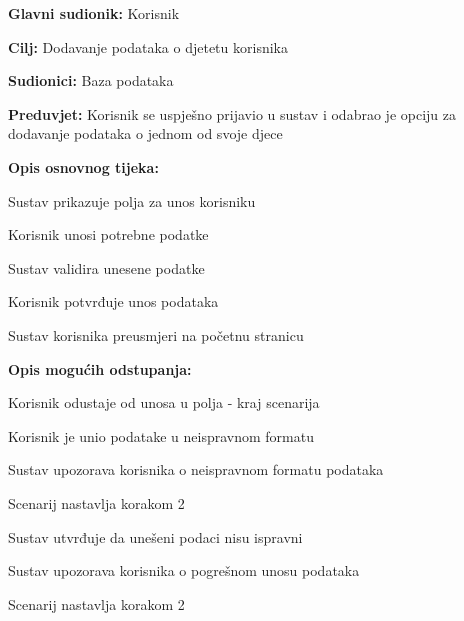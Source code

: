 					\noindent {}
					\begin{packed_item}
	
						\item \textbf{Glavni sudionik: }Korisnik
						\item  \textbf{Cilj:} Dodavanje podataka o djetetu korisnika
						\item  \textbf{Sudionici:} Baza podataka
						\item  \textbf{Preduvjet:} Korisnik se uspješno prijavio u sustav i odabrao je opciju za dodavanje podataka o jednom od svoje djece
						\item  \textbf{Opis osnovnog tijeka:}
						
						\item[] \begin{packed_enum}
							\item Sustav prikazuje polja za unos korisniku
							\item Korisnik unosi potrebne podatke
							\item Sustav validira unesene podatke
							\item Korisnik potvrđuje unos podataka
							\item Sustav korisnika preusmjeri na početnu stranicu
						\end{packed_enum}

						\item  \textbf{Opis mogućih odstupanja:}

						\item[] \begin{packed_item}
							\item[2.a] Korisnik odustaje od unosa u polja - kraj scenarija
							\item[3.a] Korisnik je unio podatake u neispravnom formatu
							\item[] \begin{packed_enum}
								\item Sustav upozorava korisnika o neispravnom formatu podataka
								\item Scenarij nastavlja korakom 2 
							\end{packed_enum}	
							\item[5.a] Sustav utvrđuje da unešeni podaci nisu ispravni
							\item[] \begin{packed_enum}
								\item Sustav upozorava korisnika o pogrešnom unosu podataka
								\item Scenarij nastavlja korakom 2 
							\end{packed_enum}					
						\end{packed_item}
					\end{packed_item}	


